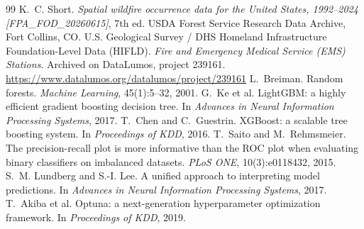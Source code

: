 \documentclass[10pt,twocolumn,letterpaper]{article}
\begin{document}
\begin{thebibliography}{99}
 K.~C. Short. \emph{Spatial wildfire occurrence data for the United States, 1992--2024 [FPA\_FOD\_20260615]}, 7th ed. USDA Forest Service Research Data Archive, Fort Collins, CO.
 U.S. Geological Survey / DHS Homeland Infrastructure Foundation-Level Data (HIFLD). \emph{Fire and Emergency Medical Service (EMS) Stations}. Archived on DataLumos, project 239161. \url{https://www.datalumos.org/datalumos/project/239161}
 L.~Breiman. Random forests. \emph{Machine Learning}, 45(1):5--32, 2001.
 G.~Ke et al. LightGBM: a highly efficient gradient boosting decision tree. In \emph{Advances in Neural Information Processing Systems}, 2017.
 T.~Chen and C.~Guestrin. XGBoost: a scalable tree boosting system. In \emph{Proceedings of KDD}, 2016.
 T.~Saito and M.~Rehmsmeier. The precision-recall plot is more informative than the ROC plot when evaluating binary classifiers on imbalanced datasets. \emph{PLoS ONE}, 10(3):e0118432, 2015.
 S.~M. Lundberg and S.-I. Lee. A unified approach to interpreting model predictions. In \emph{Advances in Neural Information Processing Systems}, 2017.
 T.~Akiba et al. Optuna: a next-generation hyperparameter optimization framework. In \emph{Proceedings of KDD}, 2019.
\end{thebibliography}
\end{document}
